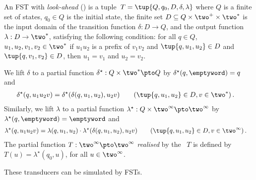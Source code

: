 \begin{definition}\label{def:LFST}
  An FST with \emph{look-ahead} (\lfst) is a tuple~$T = \tup{Q,q_0,D,\delta,\lambda}$
  where $Q$ is a finite set of states, $q_{0} \in Q$ is the initial state,
  the finite set $D \subseteq Q \times \two^{+} \times \two^{*}$ 
  is the input domain of the transition function
  $\delta : D \to Q$,
  and the output function $\lambda : D \to \two^*$, 
  satisfying the following condition:
  for all $q \in Q$, $u_1,u_2,v_1,v_2 \in \two^*$ if $u_1u_2$ is a prefix of $v_1v_2$ 
  and $\tup{q,u_1,u_2} \in D$ and $\tup{q,v_1,v_2} \in D$, then $u_1 = v_1$ and $u_2 = v_2$.

  We lift $\delta$ to a partial function $\delta^\star : Q \times \two^* \pto Q$ by
  $\delta^\star(q,\emptyword) = q$ and
  \begin{align*}
    \delta^\star(q,u_1u_2v) & = \delta^\star(\delta(q,u_1,u_2),u_2v)
    &&&& (\tup{q,u_1,u_2} \in D, v \in \two^*)\,.
  \end{align*}
  Similarly, we lift $\lambda$ to a partial function
  $\lambda^\star : Q \times \two^\infty \pto \two^\infty$ by
  $\lambda^\star(q,\emptyword) = \emptyword$ and
  \begin{align*}
\lambda^\star(q,u_1u_2v) & = \lambda(q,u_1,u_2) \cdot \lambda^\star(\delta(q,u_1,u_2),u_2v)
    &&&& (\tup{q,u_1,u_2} \in D, v \in \two^\infty)\,.
  \end{align*}
  The partial function $T : \two^\infty \pto \two^\infty$ \emph{realised} by the \lfst~$T$
  is defined by $T(u) = \lambda^\star(q_0,u)$,
  for all $u \in \two^\infty$.
\end{definition}

These transducers can be simulated by FSTs.

